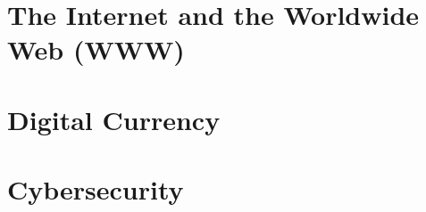 \documentclass[../main.tex]{subfiles}
\begin{document}
\section{The Internet and the Worldwide Web (WWW)}
\label{5:sec:the_internet_and_the_www}


\section{Digital Currency}
\label{5:sec:digital_currency}


\section{Cybersecurity}
\label{5:sec:cybersecurity}

\end{document}

